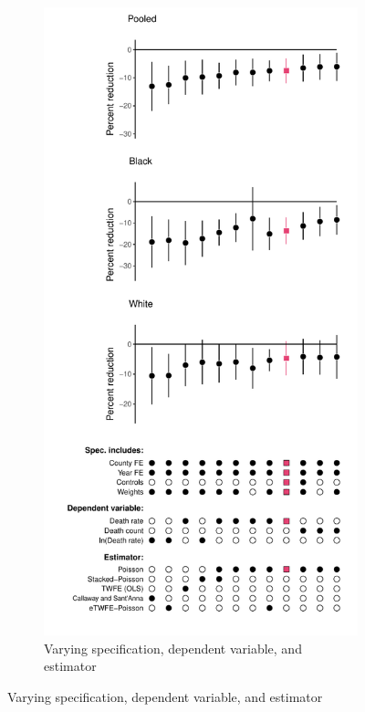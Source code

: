 \documentclass[12pt]{article}
\begin{document}
 \begin{figure}[!ht]
   \hspace*{-.5cm}
    \begin{subfigure}[t]{0.495\linewidth}
      \caption{Varying specification, dependent variable, and estimator\label{fig:main-text-visual-comparison}}
      \includegraphics[width=1.0\linewidth]{../analysis/output/main/figure_5a_spec_chart_combined.pdf}

\end{subfigure}
\end{figure}
\end{document}
